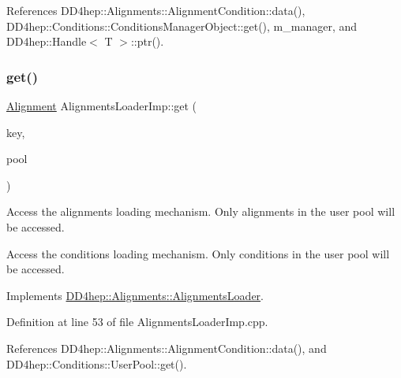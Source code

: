 References D\+D4hep\+::\+Alignments\+::\+Alignment\+Condition\+::data(), D\+D4hep\+::\+Conditions\+::\+Conditions\+Manager\+Object\+::get(), m\+\_\+manager, and D\+D4hep\+::\+Handle$<$ T $>$\+::ptr().

\hypertarget{class_d_d4hep_1_1_conditions_1_1_alignments_loader_imp_ab37a7e41559862d5c424fcad50bb6768}{}\label{class_d_d4hep_1_1_conditions_1_1_alignments_loader_imp_ab37a7e41559862d5c424fcad50bb6768} 
\subsubsection{\texorpdfstring{get()}{get()}\hspace{0.1cm}{\footnotesize\ttfamily [2/2]}}
{\footnotesize\ttfamily \hyperlink{class_d_d4hep_1_1_conditions_1_1_alignments_loader_imp_a2af19e971736ac6856523194f7eb717a}{Alignment} Alignments\+Loader\+Imp\+::get (\begin{DoxyParamCaption}\item[{\hyperlink{class_d_d4hep_1_1_alignments_1_1_alignments_loader_af56e6294e72dacbe001c1f24b8381d5d}{key\+\_\+type}}]{key,  }\item[{const \hyperlink{class_d_d4hep_1_1_conditions_1_1_user_pool}{User\+Pool} \&}]{pool }\end{DoxyParamCaption})\hspace{0.3cm}{\ttfamily [virtual]}}



Access the alignments loading mechanism. Only alignments in the user pool will be accessed. 

Access the conditions loading mechanism. Only conditions in the user pool will be accessed. 

Implements \hyperlink{class_d_d4hep_1_1_alignments_1_1_alignments_loader_a19ca11e6b9485acd5797d509ea5b4b97}{D\+D4hep\+::\+Alignments\+::\+Alignments\+Loader}.



Definition at line 53 of file Alignments\+Loader\+Imp.\+cpp.



References D\+D4hep\+::\+Alignments\+::\+Alignment\+Condition\+::data(), and D\+D4hep\+::\+Conditions\+::\+User\+Pool\+::get().

\hypertarget{class_d_d4hep_1_1_conditions_1_1_alignments_loader_imp_aa9cf749689a76b853f7d7e543f84b761}{}\label{class_d_d4hep_1_1_conditions_1_1_alignments_loader_imp_aa9cf749689a76b853f7d7e543f84b761} 
